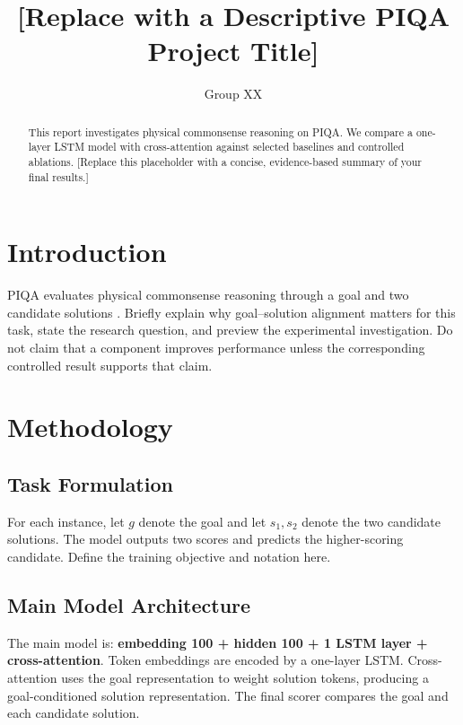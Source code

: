 \documentclass[11pt]{article}
\title{[Replace with a Descriptive PIQA Project Title]}
\author{Group XX}
\begin{document}
\maketitle

\begin{abstract}
This report investigates physical commonsense reasoning on PIQA. We compare a one-layer LSTM model with cross-attention against selected baselines and controlled ablations. [Replace this placeholder with a concise, evidence-based summary of your final results.]
\end{abstract}

\section{Introduction}

PIQA evaluates physical commonsense reasoning through a goal and two candidate solutions \citep{bisk2020experience}. Briefly explain why goal--solution alignment matters for this task, state the research question, and preview the experimental investigation. Do not claim that a component improves performance unless the corresponding controlled result supports that claim.

\section{Methodology}

\subsection{Task Formulation}

For each instance, let $g$ denote the goal and let $s_1,s_2$ denote the two candidate solutions. The model outputs two scores and predicts the higher-scoring candidate. Define the training objective and notation here.

\subsection{Main Model Architecture}

The main model is: \textbf{embedding 100 + hidden 100 + 1 LSTM layer + cross-attention}. Token embeddings are encoded by a one-layer LSTM. Cross-attention uses the goal representation to weight solution tokens, producing a goal-conditioned solution representation. The final scorer compares the goal and each candidate solution.
\end{document}
